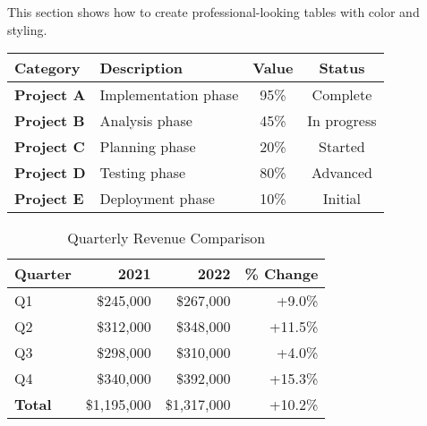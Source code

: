 \documentclass[a4paper,11pt]{article}
\begin{document}
This section shows how to create professional-looking tables with color and styling.

\begin{tcolorbox}[colback=cardbg, colframe=frameborder, coltitle=white,
    fonttitle=\bfseries, title=📊 Data Analysis Results,
    enhanced, boxrule=0.5pt, arc=4pt, left=10pt, right=10pt, top=8pt, bottom=8pt,
    attach boxed title to top left={xshift=10pt, yshift=-2mm},
    boxed title style={colback=accent, arc=2pt}
]


\begin{tabularx}{\linewidth}{>{\raggedright\arraybackslash\bfseries}X >{\raggedright\arraybackslash}X c c}
    \rowcolor{headerbg}
    \textcolor{headertext}{Category} &
    \textcolor{headertext}{Description} &
    \textcolor{headertext}{Value} &
    \textcolor{headertext}{Status} \\
    \toprule
    Project A & Implementation phase & 95\% & Complete  \\
    Project B & Analysis phase & 45\% & In progress \\
    Project C & Planning phase & 20\% & Started \\
    Project D & Testing phase & 80\% & Advanced \\
    Project E & Deployment phase & 10\% & Initial \\
    \bottomrule
\end{tabularx}

\end{tcolorbox}

\vspace{1cm}

\begin{table}[htbp]
\caption{Quarterly Revenue Comparison}
\centering
{}
\begin{tabular}{lrrr}
\rowcolor{headerbg}
\textcolor{headertext}{\textbf{Quarter}} & 
\textcolor{headertext}{\textbf{2021}} & 
\textcolor{headertext}{\textbf{2022}} & 
\textcolor{headertext}{\textbf{\% Change}} \\
\toprule
Q1 & \$245,000 & \$267,000 & +9.0\% \\
Q2 & \$312,000 & \$348,000 & +11.5\% \\
Q3 & \$298,000 & \$310,000 & +4.0\% \\
Q4 & \$340,000 & \$392,000 & +15.3\% \\
\midrule
\textbf{Total} & \$1,195,000 & \$1,317,000 & +10.2\% \\
\bottomrule
\end{tabular}
\end{table}
\end{document}
